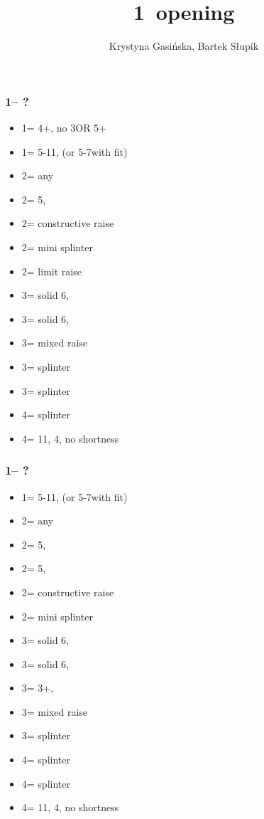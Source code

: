 \documentclass[12pt, a4paper]{article}
\title{1\majs\ opening}
\author{Krystyna Gasińska, Bartek Słupik}
\begin{document}
\maketitle


\subsubsection*{1\hearts -- ?}
\begin{itemize}
    \item 1\spades = 4+\spades, no 3\hearts OR 5\hearts + \gf
    \item 1\nt = 5-11\hcp, (or 5-7\hcp with \hearts fit)
    \item 2\clubs = any \gf
    \item 2\diams = 5\diams, \gf
    \item 2\hearts = constructive raise
    \item 2\spades = mini splinter
    \item 2\nt = limit raise
    \item 3\clubs = solid 6\clubs, \inv
    \item 3\diams = solid 6\diams, \inv
    \item 3\hearts = mixed raise
    \item 3\spades = splinter \spades
    \item 3\nt = splinter \diams
    \item 4\clubs = splinter \clubs
    \item 4\diams = 11\hcp, 4\hearts, no shortness
\end{itemize}

\subsubsection*{1\spades -- ?}
\begin{itemize}
    \item 1\nt = 5-11\hcp, (or 5-7\hcp with \spades fit)
    \item 2\clubs = any \gf
    \item 2\diams = 5\diams, \gf
    \item 2\hearts = 5\hearts, \gf
    \item 2\spades = constructive raise
    \item 2\nt = mini splinter
    \item 3\clubs = solid 6\clubs, \inv
    \item 3\diams = solid 6\diams, \inv
    \item 3\hearts = 3+\spades, \inv
    \item 3\spades = mixed raise
    \item 3\nt = splinter \hearts
    \item 4\clubs = splinter \clubs
    \item 4\diams = splinter \diams
    \item 4\hearts = 11\hcp, 4\spades, no shortness
\end{itemize}

\end{document}
